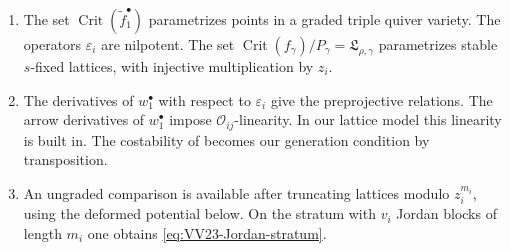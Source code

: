 \documentclass[11pt,reqno]{amsart}
\theoremstyle{definition}
\theoremstyle{remark}
\providecommand{\calO}{\mathcal O}
\begin{document}
\begin{enumerate}[label=$\mathrm{(\alph*)}$,leftmargin=8mm]
\item
The set $\operatorname{Crit}(\tilde f_1^\bullet)$ parametrizes points in a {graded} triple quiver variety. 
The operators $\varepsilon_i$ are nilpotent. 
The set $\operatorname{Crit}(f_\gamma)/P_\gamma=\mathfrak L_{\rho,\gamma}$
parametrizes stable $s$-fixed lattices, with injective multiplication by $z_i$.

\item
The derivatives of $w_1^\bullet$ with respect to $\varepsilon_i$
give the preprojective relations. The arrow derivatives of $w_1^\bullet$
impose $\calO_{ij}$-linearity. In our lattice model this linearity is built in.
The costability of \cite{VV23} becomes our generation condition by
transposition. 
\item
An {ungraded} comparison is available after
truncating lattices modulo $z_i^{m_i}$,
using the deformed potential below. On the stratum with $v_i$
Jordan blocks of length $m_i$ one obtains
\eqref{eq:VV23-Jordan-stratum}. 
\end{enumerate}
\end{document}
